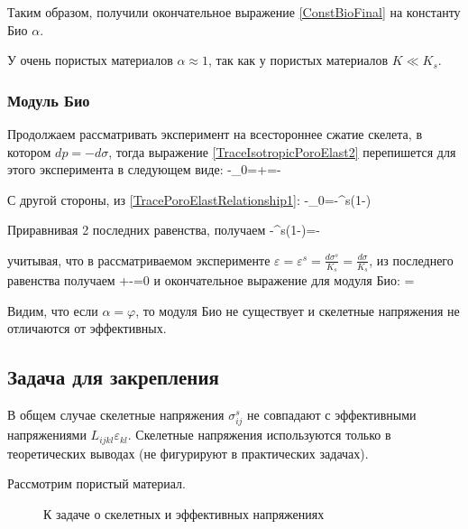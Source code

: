 \documentclass[main.tex]{subfiles}
\begin{document}
Таким образом, получили окончательное выражение \eqref{ConstBioFinal} на константу Био $\alpha$.

У очень пористых материалов $\alpha\approx1$, так как у пористых материалов $K\ll K_s$.

\subsubsection{Модуль Био}

Продолжаем рассматривать эксперимент на всестороннее сжатие скелета, в котором $dp=-d\sigma$, тогда выражение \eqref{TraceIsotropicPoroElast2} перепишется для этого эксперимента в следующем виде:
\beq
\varphi-\varphi_0=\alpha\varepsilon+=\alpha\varepsilon-
\eeq

С другой стороны, из \eqref{TracePoroElastRelationship1}:
\beq
\varphi-\varphi_0=\varepsilon-\varepsilon^s\left(1-\varphi\right)
\eeq

Приравнивая 2 последних равенства, получаем
\beq
\varepsilon-\varepsilon^s\left(1-\varphi\right)=\alpha\varepsilon-
\eeq

учитывая, что в рассматриваемом эксперименте $\displaystyle{}\varepsilon=\varepsilon^s=\frac{d\sigma^s}{K_s}=\frac{d\sigma}{K_s}$, из последнего равенства получаем
\beq
{}+-=0
\eeq
и окончательное выражение для модуля Био:
\beq
{}=
\eeq

Видим, что если $\alpha=\varphi$, то модуля Био не существует и скелетные напряжения не отличаются от эффективных.

\subsection{Задача для закрепления}

В общем случае скелетные напряжения $\sigma_{ij}^s$ не совпадают с эффективными напряжениями $L_{ijkl}\varepsilon_{kl}$. Скелетные напряжения используются только в теоретических выводах (не фигурируют в практических задачах).

Рассмотрим пористый материал.
\begin{figure}[h]
\centering
{}
\caption{К задаче о скелетных и эффективных напряжениях}
\end{figure}
\end{document}
